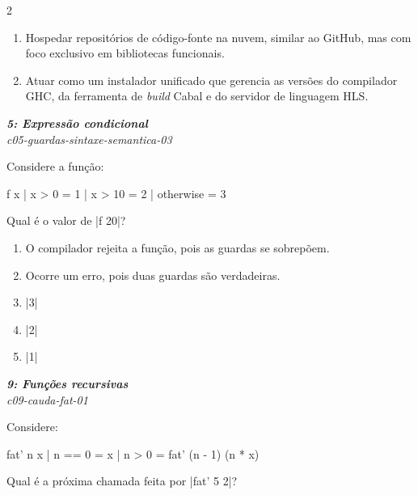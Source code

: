 \documentclass[a4paper,10pt,brazil]{article}
\begin{document}
\begin{multicols}{2}
\begin{enumerate}
  \item Hospedar repositórios de código-fonte na nuvem, similar ao GitHub, mas com foco exclusivo em bibliotecas funcionais.

  \item Atuar como um instalador unificado que gerencia as versões do compilador GHC, da ferramenta de \emph{build} Cabal e do servidor de linguagem HLS.


\end{enumerate}

\begin{flushright}
  \footnotesize
  \textit{\textbf{5: Expressão condicional}}\\
  \textit{c05-guardas-sintaxe-semantica-03}\\

\end{flushright}
Considere a função:
\begin{haskellcode}
f x
  | x > 0     = 1
  | x > 10    = 2
  | otherwise = 3
\end{haskellcode}
Qual é o valor de \haskellinline|f 20|?

\begin{enumerate}
  \item O compilador rejeita a função, pois as guardas se sobrepõem.

  \item Ocorre um erro, pois duas guardas são verdadeiras.

  \item \haskellinline|3|

  \item \haskellinline|2|

  \item \haskellinline|1|


\end{enumerate}

\begin{flushright}
  \footnotesize
  \textit{\textbf{9: Funções recursivas}}\\
  \textit{c09-cauda-fat-01}\\

\end{flushright}
Considere:
\begin{haskellcode}
fat' n x
  | n == 0 = x
  | n > 0  = fat' (n - 1) (n * x)
\end{haskellcode}
Qual é a próxima chamada feita por \haskellinline|fat' 5 2|?


\end{multicols}
\end{document}

